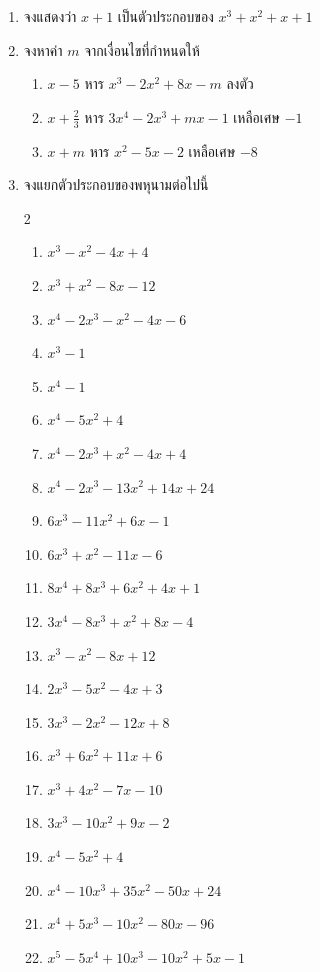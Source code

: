 \begin{enumerate}[label=\arabic*., leftmargin=*, itemsep=0.6em]
	\item จงแสดงว่า $x+1$ เป็นตัวประกอบของ $x^{3} + x^{2} + x + 1$
	
	\item จงหาค่า $m$ จากเงื่อนไขที่กำหนดให้
	\begin{enumerate}[label=\theenumi\arabic*), leftmargin=2em, itemsep=0.6em]
		\everymath{\displaystyle}
		\item $x-5$ หาร $x^{3} - 2x^{2} + 8x - m$ ลงตัว
		\item $x + \frac{2}{3}$ หาร $3x^{4} - 2x^{3} + mx - 1$ เหลือเศษ $-1$
		\item $x+m$ หาร $x^{2} - 5x - 2$ เหลือเศษ $-8$
	\end{enumerate}
	
	\item จงแยกตัวประกอบของพหุนามต่อไปนี้
\begin{multicols}{2}
		\begin{enumerate}[label=\theenumi\arabic*), leftmargin=2em, itemsep=0.5em]
		\item $x^{3} - x^{2} - 4x + 4$
		\item $x^{3} + x^{2} - 8x - 12$
		\item $x^{4} - 2x^{3} - x^{2} - 4x - 6$
		\item $x^{3} - 1$
		\item $x^{4} - 1$
		\item $x^{4} - 5x^{2} + 4$
		\item $x^{4} - 2x^{3} + x^{2} - 4x + 4$
		\item $x^{4} - 2x^{3} - 13x^{2} + 14 x + 24$
		\item $6x^{3} - 11x^{2} + 6x - 1$
		\item $6x^{3} + x^{2} - 11x - 6$
		\item $8x^{4} + 8x^{3} + 6x^{2} + 4x + 1$
		\item $3x^{4} - 8x^{3} + x^{2} + 8x - 4$
		\item $x^3 - x^2 - 8x + 12$
		\item $2x^3 - 5x^2 - 4x + 3$
		\item $3x^3 - 2x^2 - 12x + 8$
		\item $x^3 + 6x^2 + 11x + 6$
		\item $x^3 + 4x^2 - 7x - 10$
		\item $3x^3 - 10x^2 + 9x - 2$
		\item $x^4 - 5x^2 + 4$
		\item $x^4 - 10x^3 + 35x^2 - 50x + 24$
		\item $x^4 + 5x^3 - 10x^2 - 80x - 96$
		\item $x^5 - 5x^4 + 10x^3 - 10x^2 + 5x - 1$
	\end{enumerate}
\end{multicols}
\end{enumerate}

